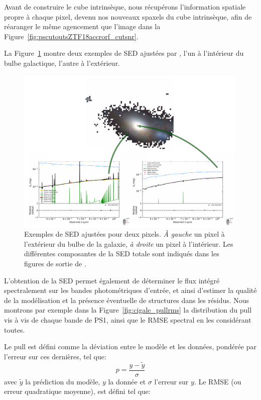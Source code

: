 \documentclass[../main/main.tex]{subfiles}
\begin{document}
Avant de construire le cube intrinsèque, nous récupérons l'information
spatiale propre à chaque pixel, devenu nos nouveaux spaxels du cube intrinsèque, afin de
réaranger le même agencement que l'image dans la
Figure~\ref{fig:pscutoutsZTF18accrorf_cutsnr}.

La Figure~\ref{fig:cigalesinglespectra} montre deux exemples de SED
ajustées par \cigale, l'un à l'intérieur du bulbe galactique, l'autre à l'extérieur.

\begin{figure}[ht]
  \centering
  \includegraphics[width=0.99\textwidth]{../figures/05_sedfit/cigalesinglespectra.pdf}
  \caption[Exemples de SED fittés]{Exemples de SED ajustées pour deux
    pixels. \textit{À gauche} un pixel à l'extérieur du bulbe de la
    galaxie, \textit{à droite} un pixel à l'intérieur. Les différentes
    composantes de la SED totale sont indiqués dans les figures de
    sortie de \cigale.}
  \label{fig:cigalesinglespectra}
\end{figure}

L'obtention de la SED permet également de déterminer le flux intégré spectralement sur
les bandes photométriques d'entrée, et ainsi d'estimer la qualité de
la modélisation et la présence éventuelle de structures dans les résidus. Nous montrons par exemple dans la
Figure~\ref{fig:cigale_pullrms} la distribution du pull vis à vis de
chaque bande de PS1, ainsi que le RMSE spectral en les considérant
toutes.

Le pull est défini comme la déviation entre le modèle et les données,
pondérée par l'erreur sur ces dernières, tel que:
\begin{equation}
  \label{eq:pull}
  p = \frac{y - \widetilde{y}}{\sigma}
\end{equation}
avec $\widetilde{y}$ la prédiction du modèle, $y$ la donnée et $\sigma$
l'erreur sur $y$.
Le RMSE (ou erreur quadratique moyenne), est défini tel que:
\end{document}
